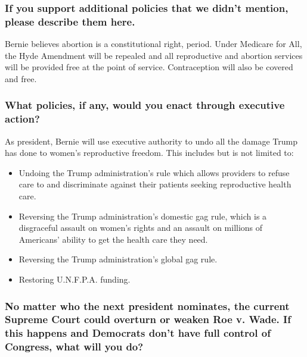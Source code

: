 \hypertarget{if-you-support-additional-policies-that-we-didnt-mention-please-describe-them-here-4}{%
\subsubsection{If you support additional policies that we didn't
mention, please describe them
here.}\label{if-you-support-additional-policies-that-we-didnt-mention-please-describe-them-here-4}}

Bernie believes abortion is a constitutional right, period. Under
Medicare for All, the Hyde Amendment will be repealed and all
reproductive and abortion services will be provided free at the point of
service. Contraception will also be covered and free.

\hypertarget{what-policies-if-any-would-you-enact-through-executive-action-4}{%
\subsubsection{What policies, if any, would you enact through executive
action?}\label{what-policies-if-any-would-you-enact-through-executive-action-4}}

As president, Bernie will use executive authority to undo all the damage
Trump has done to women's reproductive freedom. This includes but is not
limited to:

\begin{itemize}
\item
  Undoing the Trump administration's rule which allows providers to
  refuse care to and discriminate against their patients seeking
  reproductive health care.
\item
  Reversing the Trump administration's domestic gag rule, which is a
  disgraceful assault on women's rights and an assault on millions of
  Americans' ability to get the health care they need.
\item
  Reversing the Trump administration's global gag rule.
\item
  Restoring U.N.F.P.A. funding.
\end{itemize}

\hypertarget{no-matter-who-the-next-president-nominates-the-current-supreme-court-could-overturn-or-weaken-roe-v-wade-if-this-happens-and-democrats-dont-have-full-control-of-congress-what-will-you-do-4}{%
\subsubsection{No matter who the next president nominates, the current
Supreme Court could overturn or weaken Roe v. Wade. If this happens and
Democrats don't have full control of Congress, what will you
do?}\label{no-matter-who-the-next-president-nominates-the-current-supreme-court-could-overturn-or-weaken-roe-v-wade-if-this-happens-and-democrats-dont-have-full-control-of-congress-what-will-you-do-4}}

